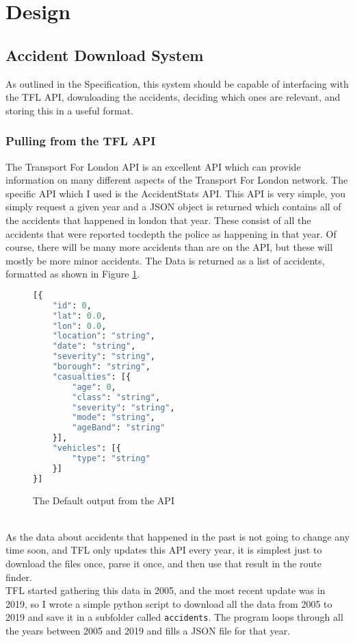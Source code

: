 \section{Design}
\subsection{Accident Download System}
As outlined in the Specification, this system should be capable of interfacing with the TFL API, downloading the accidents, deciding which ones are relevant, and storing this in a useful format.
\subsubsection{Pulling from the TFL API}
The Transport For London API is an excellent API which can provide information on many different aspects of the Transport For London network. The specific API which I used is the AccidentStats API.
This API is very simple, you simply request a given year and a JSON object is returned which contains all of the accidents that happened in london that year. These consist of all the accidents that were reported tocdepth
the police as happening in that year. Of course, there will be many more accidents than are on the API, but these will mostly be more minor accidents.
The Data is returned as a list of accidents, formatted as shown in Figure \ref{Default}.
\begin{figure}[t]
\begin{lstlisting}[language=Python]
[{
    "id": 0,
    "lat": 0.0,
    "lon": 0.0,
    "location": "string",
    "date": "string",
    "severity": "string",
    "borough": "string",
    "casualties": [{
        "age": 0,
        "class": "string",
        "severity": "string",
        "mode": "string",
        "ageBand": "string"
    }],
    "vehicles": [{
        "type": "string"
    }]
}]
    \end{lstlisting}
\caption{The Default output from the API}
\label{Default}
\end{figure}
\\
As the data about accidents that happened in the past is not going to change any time soon, and TFL only updates this API every year, it is simplest just to download the files once, parse it once, and then 
use that result in the route finder.\\
TFL started gathering this data in 2005, and the most recent update was in 2019, so I wrote a simple python script to download all the data from 2005 to 2019 and save it in a subfolder called \texttt{accidents}.
The program loops through all the years between 2005 and 2019 and fills a JSON file for that year. \\
